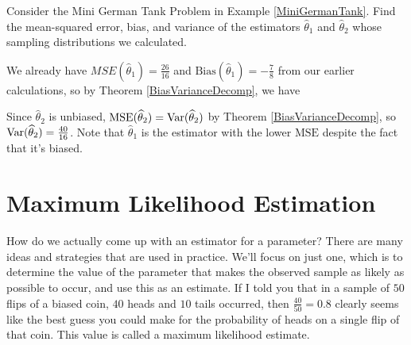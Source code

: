 \begin{examp} Consider the Mini German Tank Problem in Example \ref{MiniGermanTank}. Find the mean-squared error, bias, and variance of the estimators $\widehat{\theta}_1$ and $\widehat{\theta}_2$ whose sampling distributions we calculated.
\par
\noindent We already have $MSE(\widehat{\theta}_1) =\frac{26}{16}$ and $\text{Bias}(\widehat{\theta}_1) =-\frac{7}{8}$ from our earlier calculations, so by Theorem \ref{BiasVarianceDecomp}, we have
\par
\noindent Since $\widehat{\theta}_2$ is unbiased, $\text{MSE}(\widehat{\theta}_2) = \operatorname{Var}(\widehat{\theta}_2)$ by Theorem \ref{BiasVarianceDecomp}, so $\operatorname{Var}(\widehat{\theta}_2) = \frac{40}{16}$. Note that $\widehat{\theta}_1$ is the estimator with the lower $\text{MSE}$ despite the fact that it's biased.
\end{examp}

\section{Maximum Likelihood Estimation}

How do we actually come up with an estimator for a parameter? There are many ideas and strategies that are used in practice. We'll focus on just one, which is to determine the value of the parameter that makes the observed sample as likely as possible to occur, and use this as an estimate. If I told you that in a sample of $50$ flips of a biased coin, $40$ heads and $10$ tails occurred, then $\frac{40}{50} = 0.8$ clearly seems like the best guess you could make for the probability of heads on a single flip of that coin. This value is called a maximum likelihood estimate.

